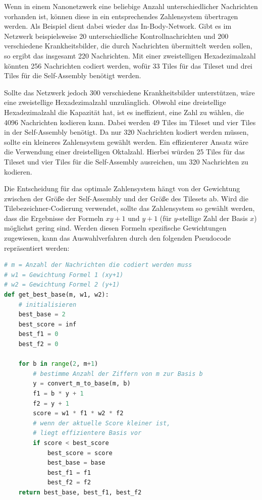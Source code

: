 Wenn in einem Nanonetzwerk eine beliebige Anzahl unterschiedlicher Nachrichten vorhanden ist, können diese in ein entsprechendes Zahlensystem übertragen werden. Als Beispiel dient dabei wieder das In-Body-Network. Gibt es im Netzwerk beispielsweise 20 unterschiedliche Kontrollnachrichten und 200 verschiedene Krankheitsbilder, die durch Nachrichten übermittelt werden sollen, so ergibt das insgesamt 220 Nachrichten. Mit einer zweistelligen Hexadezimalzahl könnten 256 Nachrichten codiert werden, wofür 33 Tiles für das Tileset und drei Tiles für die Self-Assembly benötigt werden.

Sollte das Netzwerk jedoch 300 verschiedene Krankheitsbilder unterstützen, wäre eine zweistellige Hexadezimalzahl unzulänglich.
Obwohl eine dreistellige Hexadezimalzahl die Kapazität hat, ist es ineffizient, eine Zahl zu wählen, die 4096 Nachrichten kodieren kann. Dabei werden 49 Tiles im Tileset und vier Tiles in der Self-Assembly benötigt. Da nur 320 Nachrichten kodiert werden müssen, sollte ein kleineres Zahlensystem gewählt werden. Ein effizienterer Ansatz wäre die Verwendung einer dreistelligen Oktalzahl. Hierbei würden 25 Tiles für das Tileset und vier Tiles für die Self-Assembly ausreichen, um 320 Nachrichten zu kodieren.

Die Entscheidung für das optimale Zahlensystem hängt von der Gewichtung zwischen der Größe der Self-Assembly und der Größe des Tilesets ab. Wird die Tilebezeichner-Codierung verwendet, sollte das Zahlensystem so gewählt werden, dass die Ergebnisse der Formeln $xy+1$ und $y+1$ (für $y$-stellige Zahl der Basis $x$) möglichst gering sind. Werden diesen Formeln spezifische Gewichtungen zugewiesen, kann das Auswahlverfahren durch den folgenden Pseudocode repräsentiert werden:


\begin{lstlisting}[language=Python, caption={[Pseudocode für eine Funktion zur Definition der besten Basis.]{Pseudocode für eine Funktion zur Definition der besten Basis abhängig von der Anzahl der zu codierenden Nachrichten und den Gewichtungen von Tileset und Assembly. Der gesamte Code ist im Anhang \ref{app:code} verlinkt.}}, label=lst:best_base]
# m = Anzahl der Nachrichten die codiert werden muss
# w1 = Gewichtung Formel 1 (xy+1)
# w2 = Gewichtung Formel 2 (y+1)
def get_best_base(m, w1, w2):
    # initialisieren
    best_base = 2
    best_score = inf 
    best_f1 = 0
    best_f2 = 0

    for b in range(2, m+1)
        # bestimme Anzahl der Ziffern von m zur Basis b
        y = convert_m_to_base(m, b)
        f1 = b * y + 1
        f2 = y + 1
        score = w1 * f1 * w2 * f2
        # wenn der aktuelle Score kleiner ist, 
        # liegt effizientere Basis vor
        if score < best_score
            best_score = score 
            best_base = base 
            best_f1 = f1 
            best_f2 = f2
    return best_base, best_f1, best_f2
\end{lstlisting}

